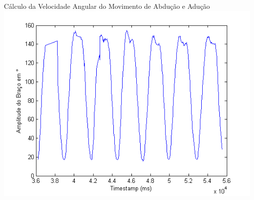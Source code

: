 \documentclass{beamer}
\begin{document}
%


\begin{frame}{Cálculo da Velocidade Angular do Movimento de Abdução e Adução}
      \center \includegraphics[height=2.8 in]{img/amplitude-braco.png}
\end{frame}
\end{document}
